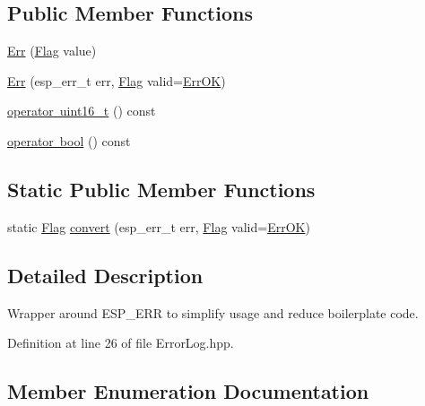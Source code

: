 \subsection*{Public Member Functions}
\begin{DoxyCompactItemize}
\item 
\mbox{\hyperlink{classErr_a24c3a115a0fe75d783de8a482ee41813}{Err}} (\mbox{\hyperlink{classErr_a5027803a04dbda5395326274137d63ff}{Flag}} value)
\item 
\mbox{\hyperlink{classErr_a1c99df024167b504910fb3404e5496ee}{Err}} (esp\+\_\+err\+\_\+t err, \mbox{\hyperlink{classErr_a5027803a04dbda5395326274137d63ff}{Flag}} valid=\mbox{\hyperlink{classErr_a5027803a04dbda5395326274137d63ffa32bb3ca49d660fa0525cba5aeb786059}{Err\+OK}})
\item 
\mbox{\hyperlink{classErr_a9cc396112612083a8d9c2cea6fa6224a}{operator uint16\+\_\+t}} () const
\item 
\mbox{\hyperlink{classErr_ae06ae9da0fc2aeeab3d8fd5e709cab9e}{operator bool}} () const
\end{DoxyCompactItemize}
\subsection*{Static Public Member Functions}
\begin{DoxyCompactItemize}
\item 
static \mbox{\hyperlink{classErr_a5027803a04dbda5395326274137d63ff}{Flag}} \mbox{\hyperlink{classErr_af320160955e90df0ddb4e84d99027562}{convert}} (esp\+\_\+err\+\_\+t err, \mbox{\hyperlink{classErr_a5027803a04dbda5395326274137d63ff}{Flag}} valid=\mbox{\hyperlink{classErr_a5027803a04dbda5395326274137d63ffa32bb3ca49d660fa0525cba5aeb786059}{Err\+OK}})
\end{DoxyCompactItemize}


\subsection{Detailed Description}
Wrapper around E\+S\+P\+\_\+\+E\+RR to simplify usage and reduce boilerplate code. 

Definition at line 26 of file Error\+Log.\+hpp.



\subsection{Member Enumeration Documentation}
\mbox{\label{classErr_a5027803a04dbda5395326274137d63ff}} 
